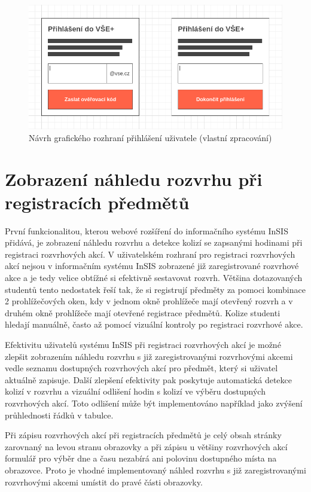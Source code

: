 \begin{figure}[htbp!]\centering
    \includegraphics[width=\textwidth]{img/wireframe-autentikace.png}
    \caption{Návrh grafického rozhraní přihlášení uživatele (vlastní zpracování)}
    \label{fig:autentikace-wireframe}
\end{figure}

\section{Zobrazení náhledu rozvrhu při registracích předmětů}

První funkcionalitou, kterou webové rozšíření do informačního systému InSIS přidává, je zobrazení náhledu rozvrhu a detekce kolizí se zapsanými hodinami při registraci rozvrhových akcí. V uživatelském rozhraní pro registraci rozvrhových akcí nejsou v informačním systému InSIS zobrazené již zaregistrované rozvrhové akce a je tedy velice obtížné si efektivně sestavovat rozvrh. Většina dotazovaných studentů tento nedostatek řeší tak, že si registrují předměty za pomoci kombinace 2 prohlížečových oken, kdy v jednom okně prohlížeče mají otevřený rozvrh a v druhém okně prohlížeče mají otevřené registrace předmětů. Kolize studenti hledají manuálně, často až pomocí vizuální kontroly po registraci rozvrhové akce.

Efektivitu uživatelů systému InSIS při registraci rozvrhových akcí je možné zlepšit zobrazením náhledu rozvrhu s již zaregistrovanými rozvrhovými akcemi vedle seznamu dostupných rozvrhových akcí pro předmět, který si uživatel aktuálně zapisuje. Další zlepšení efektivity pak poskytuje automatická detekce kolizí v rozvrhu a vizuální odlišení hodin s kolizí ve výběru dostupných rozvrhových akcí. Toto odlišení může být implementováno například jako zvýšení průhlednosti řádků v tabulce. 

Při zápisu rozvrhových akcí při registracích předmětů je celý obsah stránky zarovnaný na levou stranu obrazovky a při zápisu u většiny rozvrhových akcí formulář pro výběr dne a času nezabírá ani polovinu dostupného místa na obrazovce. Proto je vhodné implementovaný náhled rozvrhu s již zaregistrovanými rozvrhovými akcemi umístit do pravé části obrazovky.

